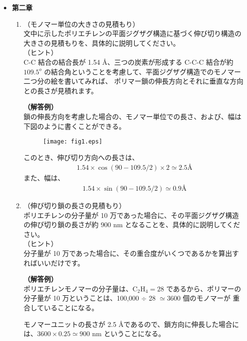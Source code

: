 \documentclass[a4paper,11pt]{ltjsarticle}
\begin{document}
\begin{itemize}
\begin{enumerate}
	\end{enumerate}

\item
{\bf 第二章}

	\begin{enumerate}
		\item
		（モノマー単位の大きさの見積もり）\\
		文中に示したポリエチレンの平面ジグザグ構造に基づく伸び切り構造の大きさの見積もりを、具体的に説明してください。\\
		（ヒント）\\
		C-C 結合の結合長が 1.54 \AA、三つの炭素が形成する C-C-C 結合が約 $109.5^o$ の結合角ということを考慮して、平面ジグザグ構造でのモノマー二つ分の絵を書いてみれば、
		ポリマー鎖の伸長方向とそれに垂直な方向との長さが見積れます。

		{\bf（解答例）}\\
		鎖の伸長方向を考慮した場合の、モノマー単位での長さ、および、幅は下図のように書くことができる。
		\begin{figure}[htb]
		\centering
		\texttt{[image: fig1.eps]}
		\end{figure}

		このとき、伸び切り方向への長さは、
		\begin{align*}
		1.54 \times \cos (90 - 109.5/2) \times 2 \simeq 2.5 \text{\AA}
		\end{align*}
		また、幅は、
		\begin{align*}
		1.54 \times \sin (90 - 109.5/2) \simeq 0.9 \text{\AA}
		\end{align*}

		\item
		（伸び切り鎖の長さの見積もり）\\
		ポリエチレンの分子量が 10 万であった場合に、その平面ジグザグ構造の伸び切り鎖の長さが約 900 nm となることを、具体的に説明してください。\\
		（ヒント）\\
		分子量が 10 万であった場合に、その重合度がいくつであるかを算出すればいいだけです。

		{\bf（解答例）}\\
		ポリエチレンモノマーの分子量は、C$_2$H$_4 = 28$ であるから、ポリマーの分子量が 10 万ということは、100,000 $\div$ 28 $\simeq $3600 個のモノマーが
		重合していることになる。

		モノマーユニットの長さが 2.5 \AA であるので、鎖方向に伸長した場合には、$3600 \times 0.25 \simeq 900$ nm ということになる。


\end{enumerate}
\end{itemize}
\end{document}
